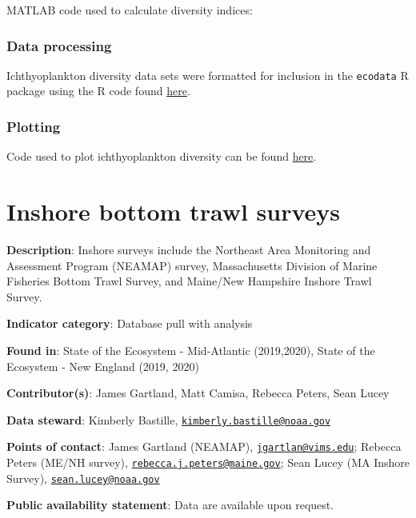 \documentclass[
]{book}
\begin{document}
MATLAB code used to calculate diversity indices:

\hypertarget{data-processing-13}{%
\subsection{Data processing}\label{data-processing-13}}

Ichthyoplankton diversity data sets were formatted for inclusion in the \texttt{ecodata} R package using the R code found \href{https://github.com/NOAA-EDAB/ecodata/blob/master/data-raw/get_ichthyoplankton.R}{here}.

\hypertarget{plotting-12}{%
\subsection{Plotting}\label{plotting-12}}

Code used to plot ichthyoplankton diversity can be found \href{https://github.com/NOAA-EDAB/tech-doc/tree/master/R/stored_scripts/ich_div_plotting.R}{here}.

\hypertarget{inshoresurvdat}{%
\chapter{Inshore bottom trawl surveys}\label{inshoresurvdat}}

\textbf{Description}: Inshore surveys include the Northeast Area Monitoring and Assessment Program (NEAMAP) survey, Massachusetts Division of Marine Fisheries Bottom Trawl Survey, and Maine/New Hampshire Inshore Trawl Survey.

\textbf{Indicator category}: Database pull with analysis

\textbf{Found in}: State of the Ecosystem - Mid-Atlantic (2019,2020), State of the Ecosystem - New England (2019, 2020)

\textbf{Contributor(s)}: James Gartland, Matt Camisa, Rebecca Peters, Sean Lucey

\textbf{Data steward}: Kimberly Bastille, \href{mailto:kimberly.bastille@noaa.gov}{\nolinkurl{kimberly.bastille@noaa.gov}}

\textbf{Points of contact}: James Gartland (NEAMAP), \href{mailto:jgartlan@vims.edu}{\nolinkurl{jgartlan@vims.edu}}; Rebecca Peters (ME/NH survey), \href{mailto:rebecca.j.peters@maine.gov}{\nolinkurl{rebecca.j.peters@maine.gov}}; Sean Lucey (MA Inshore Survey), \href{mailto:sean.lucey@noaa.gov}{\nolinkurl{sean.lucey@noaa.gov}}

\textbf{Public availability statement}: Data are available upon request.
\end{document}
